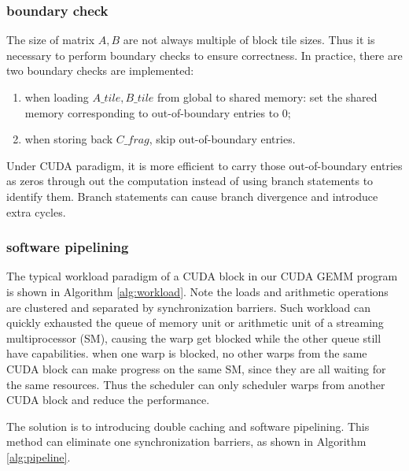 \documentclass{article}
\begin{document}
\subsubsection{boundary check}
The size of matrix $A, B$ are not always multiple of block tile sizes.
Thus it is necessary to perform boundary checks to ensure correctness.
In practice, there are two boundary checks are implemented:

\begin{enumerate}
    \item when loading $A\_tile,B\_tile$ from global to shared memory:
    set the shared memory corresponding to out-of-boundary entries to 0;
    \item when storing back $C\_frag$, 
    skip out-of-boundary entries.
\end{enumerate}

Under CUDA paradigm, it is more efficient to 
carry those out-of-boundary entries as zeros
through out the computation instead of using branch statements to identify them.
Branch statements can cause branch divergence and introduce extra cycles.


\subsubsection{software pipelining}
The typical workload paradigm of a CUDA block in our CUDA GEMM program
is shown in Algorithm \ref{alg:workload}.
Note the loads and arithmetic operations are clustered and separated by synchronization barriers. 
Such workload can quickly exhausted the queue of memory unit or arithmetic unit of a streaming multiprocessor (SM),
causing the warp get blocked while the other queue still have capabilities.
when one warp is blocked, 
no other warps from the same CUDA block can make progress on the same SM, 
since they are all waiting for the same resources.
Thus the scheduler can only scheduler warps from another CUDA block and reduce the performance.

The solution is to introducing double caching and software pipelining.
This method can eliminate one synchronization barriers,
as shown in Algorithm \ref{alg:pipeline}.
\end{document}
